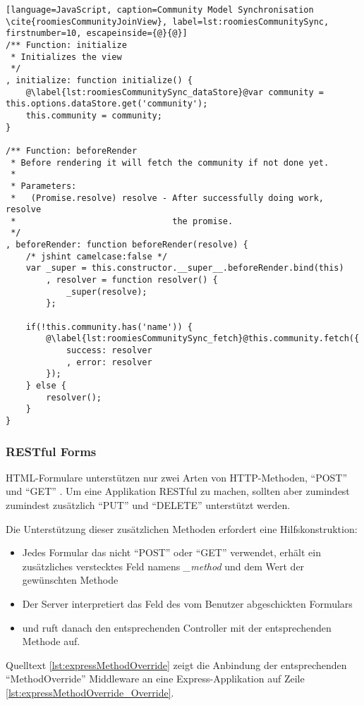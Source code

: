 \begin{lstlisting}[language=JavaScript, caption=Community Model Synchronisation \cite{roomiesCommunityJoinView}, label=lst:roomiesCommunitySync, firstnumber=10, escapeinside={@}{@}]
/** Function: initialize
 * Initializes the view
 */
, initialize: function initialize() {
	@\label{lst:roomiesCommunitySync_dataStore}@var community = this.options.dataStore.get('community');
	this.community = community;
}

/** Function: beforeRender
 * Before rendering it will fetch the community if not done yet.
 *
 * Parameters:
 *   (Promise.resolve) resolve - After successfully doing work, resolve
 *                               the promise.
 */
, beforeRender: function beforeRender(resolve) {
	/* jshint camelcase:false */
	var _super = this.constructor.__super__.beforeRender.bind(this)
		, resolver = function resolver() {
			_super(resolve);
		};

	if(!this.community.has('name')) {
		@\label{lst:roomiesCommunitySync_fetch}@this.community.fetch({
			success: resolver
			, error: resolver
		});
	} else {
		resolver();
	}
}
\end{lstlisting}

\subsubsection*{\gls{RESTful} Forms}
HTML-Formulare unterstützen nur zwei Arten von HTTP-Methoden, ``POST'' und ``GET'' \cite{FormMethodMDN}. Um eine Applikation \gls{RESTful} zu machen, sollten aber zumindest zumindest zusätzlich ``PUT'' und ``DELETE'' unterstützt werden.

Die Unterstützung dieser zusätzlichen Methoden erfordert eine Hilfskonstruktion:
\begin{itemize}
	\item Jedes Formular das nicht ``POST'' oder ``GET'' verwendet, erhält ein zusätzliches verstecktes Feld namens \emph{\_method} und dem Wert der gewünschten Methode
	\item Der Server interpretiert das Feld des vom Benutzer abgeschickten Formulars
	\item und ruft danach den entsprechenden Controller mit der entsprechenden Methode auf.
\end{itemize}

Quelltext \ref{lst:expressMethodOverride} zeigt die Anbindung der entsprechenden ``MethodOverride'' Middleware \cite{methodOverrideMiddleware} an eine Express-Applikation auf Zeile \ref{lst:expressMethodOverride_Override}.

